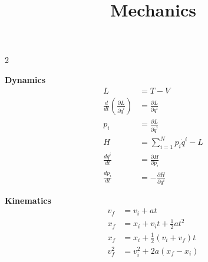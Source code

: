 \documentclass[12pt]{article}
\title{Mechanics}
\date{}
\begin{document}
\maketitle

\begin{multicols}{2}

\textbf{Dynamics}
\begin{align}
  L &= T - V\\
  \frac{d}{dt}(\frac{\partial L}{\partial \dot{q}^i}) &= \frac{\partial L}{\partial q^i}\\
  p_i &= \frac{\partial L}{\partial \dot{q}^i}\\
  H &= \sum_{i = 1}^{N} p_i \dot{q}^i - L\\
  \frac{dq^i}{dt} &= \frac{\partial H}{\partial p_i}\\
  \frac{dp_i}{dt} &= -\frac{\partial H}{\partial q^i}
\end{align}

\textbf{Kinematics}
\begin{align}
  v_f &= v_i + a t\\
  x_f &= x_i + v_it+ \frac{1}{2}at^2\\
  x_f &= x_i + \frac{1}{2}(v_i + v_f)t\\
  v_f^2 &= v_i^2 + 2 a (x_f - x_i)
\end{align}

\end{multicols}
\end{document}
